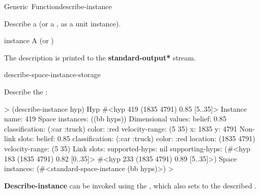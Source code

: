 \documentclass[10pt,twoside,english,pdftex]{article}
\begin{document}

\begin{functiondoc}{Generic~Function}{describe-instance}%
  {}
%
%
%

\fnsyntax

\fnpurpose Describe a  (or a
, as a unit instance).

\fnmethods
{}%
  {\code{(} }
\fnpackage {}

\fnmodule {}

\fnargs
\begin{args}{instance}
\arg[instance] A  (or )
\end{args}

\fndescription
{}%
The description is printed to the {\bf *standard-output*} stream.

\begin{alsos}{describe-space-instance-storage}
\end{alsos}

\fnexample
Describe the  :
%
\W\supp
\begin{example}
  > (describe-instance hyp)
  Hyp #<hyp 419 (1835 4791) 0.85 [5..35]>
    Instance name: 419
    Space instances: ((bb hyps))
    Dimensional values:
      belief:  0.85
      classification:  (:car :truck)
      color:  :red
      velocity-range:  (5 35)
      x:  1835
      y:  4791
    Non-link slots:
      belief:  0.85
      classification:  (:car :truck)
      color:  :red
      location:  (1835 4791)
      velocity-range:  (5 35)
    Link slots:
      supported-hyps:  nil
      supporting-hyps:  (#<hyp 183 (1835 4791) 0.82 [0..35]>
                         #<hyp 233 (1835 4791) 0.89 [5..35]>)
    Space instances: (#<standard-space-instance (bb hyps)>)
  >
\end{example}

\fnnote 
%
%
%
\textbf{Describe-instance} can be invoked using the 
, which also sets \code{=} to the described .

\end{functiondoc}
\end{document}
